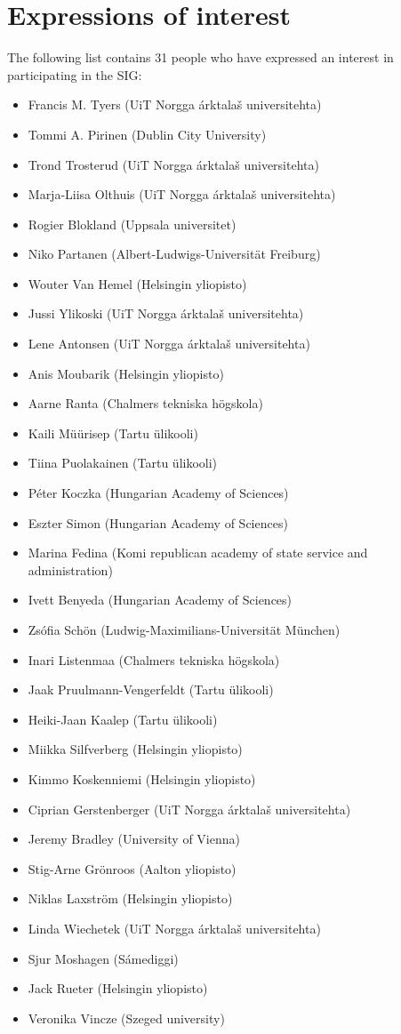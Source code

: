 \documentclass[11pt,a4paper]{article}
\begin{document}
\section*{Expressions of interest}

The following list contains 31 people who have expressed an interest in 
participating in the SIG:

\begin{itemize}
  \item Francis M. Tyers (UiT Norgga árktalaš universitehta)
  \item Tommi A. Pirinen (Dublin City University)
  \item Trond Trosterud (UiT Norgga árktalaš universitehta)
  \item Marja-Liisa Olthuis (UiT Norgga árktalaš universitehta)
  \item Rogier Blokland (Uppsala universitet)
  \item Niko Partanen (Albert-Ludwigs-Universität Freiburg)
  \item Wouter Van Hemel (Helsingin yliopisto)
  \item Jussi Ylikoski (UiT Norgga árktalaš universitehta)
  \item Lene Antonsen (UiT Norgga árktalaš universitehta)
  \item Anis Moubarik (Helsingin yliopisto)
  \item Aarne Ranta (Chalmers tekniska högskola)
  \item Kaili Müürisep (Tartu ülikooli)
  \item Tiina Puolakainen (Tartu ülikooli)
  \item Péter Koczka (Hungarian Academy of Sciences)
  \item Eszter Simon (Hungarian Academy of Sciences)
  \item Marina Fedina (Komi republican academy of state service and administration)
  \item Ivett Benyeda (Hungarian Academy of Sciences)
  \item Zsófia Schön (Ludwig-Maximilians-Universität München)
  \item Inari Listenmaa (Chalmers tekniska högskola)
  \item Jaak Pruulmann-Vengerfeldt (Tartu ülikooli)
  \item Heiki-Jaan Kaalep (Tartu ülikooli)
  \item Miikka Silfverberg (Helsingin yliopisto)
  \item Kimmo Koskenniemi (Helsingin yliopisto)
  \item Ciprian Gerstenberger (UiT Norgga árktalaš universitehta)
  \item Jeremy Bradley (University of Vienna)
  \item Stig-Arne Grönroos (Aalton yliopisto)
  \item Niklas Laxström (Helsingin yliopisto)
  \item Linda Wiechetek (UiT Norgga árktalaš universitehta)
  \item Sjur Moshagen (Sámediggi)
  \item Jack Rueter (Helsingin yliopisto)
  \item Veronika Vincze (Szeged university)
\end{itemize}
\end{document}
